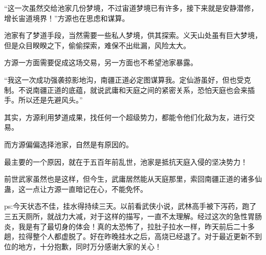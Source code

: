 \begin{this_body}
“这一次虽然交给池家几份梦境，不过宙道梦境已有许多，接下来就是安静潜修，增长宙道境界！”方源也在思虑和谋算。

池家有了梦道手段，当然需要一些私人梦境，供其探索。义天山处虽有巨大梦境，但是众目睽睽之下，偷偷探索，难保不出纰漏，风险太大。

方源一方面需要促成这场交易，另一方面也不希望池家暴露。

“我这一次成功强袭掠影地沟，南疆正道必定图谋算我。定仙游虽好，但也受克制。不说南疆正道的底蕴，就说武庸和天庭之间的紧密关系，恐怕天庭也会来插手。所以还是先避风头。”

其实，方源利用梦道成果，找任何一个超级势力，都能令他们化敌为友，进行交易。

而方源偏偏选择池家，自然是有原因的。

最主要的一个原因，就在于五百年前乱世，池家是抵抗天庭入侵的坚决势力！

前世武家虽然也是这样，但今生，武庸居然能从天庭那里，索回南疆正道的诸多仙蛊，这一点让方源一直暗记在心，不能免怀。

ps:今天状态不佳，挂水得持续三天。以前看武侠小说，武林高手被下泻药，跑了三五天厕所，就战力大减，对于这样的描写，一直不太理解。经过这次的急性胃肠炎，我是有了最切身的体会！真的太恐怖了，拉肚子拉水一样，昨天前后二十多趟，拉得整个人都虚脱了。好在昨晚挂水之后，高烧已经退了。对于最近更新不到位的地方，十分抱歉，同时万分感谢大家的关心！

\end{this_body}

